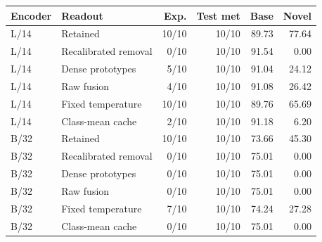 \begin{tabular}{llrrrr}
\toprule
Encoder & Readout & Exp. & Test met & Base & Novel \\
\midrule
L/14 & Retained & 10/10 & 10/10 & 89.73 & 77.64 \\
L/14 & Recalibrated removal & 0/10 & 10/10 & 91.54 & 0.00 \\
L/14 & Dense prototypes & 5/10 & 10/10 & 91.04 & 24.12 \\
L/14 & Raw fusion & 4/10 & 10/10 & 91.08 & 26.42 \\
L/14 & Fixed temperature & 10/10 & 10/10 & 89.76 & 65.69 \\
L/14 & Class-mean cache & 2/10 & 10/10 & 91.18 & 6.20 \\
\midrule
B/32 & Retained & 10/10 & 10/10 & 73.66 & 45.30 \\
B/32 & Recalibrated removal & 0/10 & 10/10 & 75.01 & 0.00 \\
B/32 & Dense prototypes & 0/10 & 10/10 & 75.01 & 0.00 \\
B/32 & Raw fusion & 0/10 & 10/10 & 75.01 & 0.00 \\
B/32 & Fixed temperature & 7/10 & 10/10 & 74.24 & 27.28 \\
B/32 & Class-mean cache & 0/10 & 10/10 & 75.01 & 0.00 \\
\bottomrule
\end{tabular}
